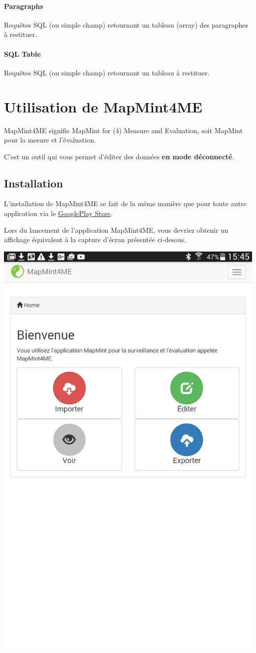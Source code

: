 \documentclass[letterpaper,10pt,english]{sphinxmanual}
\begin{document}
\paragraph{Paragraphs}
\label{tables/infopanel:paragraphs}
Requêtes SQL (ou simple champ) retournant un tableau (array) des
paragraphes à restituer.


\paragraph{SQL Table}
\label{tables/infopanel:sql-table}
Requêtes SQL (ou simple champ) retournant un tableau à restituer.


\section{Utilisation de MapMint4ME}
\label{tables/mapmint4me:tables-mm4me}\label{tables/mapmint4me::doc}\label{tables/mapmint4me:utilisation-de-mapmint4me}
MapMint4ME signifie MapMint for (4) Measure and Evaluation, soit MapMint pour
la mesure et l'évaluation.

C'est un outil qui vous permet d'éditer des données \textbf{en mode déconnecté}.


\subsection{Installation}
\label{tables/mapmint4me:installation}
L'installation de MapMint4ME se fait de la même manière que pour toute autre application via le \href{https://play.google.com/store/apps/details?id=fr.geolabs.dev.mapmint4me}{GooglePlay Store}.

Lors du lancement de l'application MapMint4ME, vous devriez obtenir un affichage équivalent à la capture d'écran présentée ci-desous.

{\hfill\includegraphics[width=0.450\linewidth]{mm4me-welcome.png}\hfill}
\end{document}
